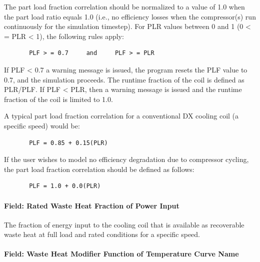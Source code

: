 The part load fraction correlation should be normalized to a value of 1.0 when the part load ratio equals 1.0 (i.e., no efficiency losses when the compressor(s) run continuously for the simulation timestep). For PLR values between 0 and 1 (0 \textless{} = PLR \textless{} 1), the following rules apply:

\begin{lstlisting}
       PLF > = 0.7     and     PLF > = PLR
\end{lstlisting}

If PLF \textless{} 0.7 a warning message is issued, the program resets the PLF value to 0.7, and the simulation proceeds. The runtime fraction of the coil is defined as PLR/PLF. If PLF \textless{} PLR, then a warning message is issued and the runtime fraction of the coil is limited to 1.0.

A typical part load fraction correlation for a conventional DX cooling coil (a specific speed) would be:

\begin{lstlisting}
       PLF = 0.85 + 0.15(PLR)
\end{lstlisting}

If the user wishes to model no efficiency degradation due to compressor cycling, the part load fraction correlation should be defined as follows:

\begin{lstlisting}
       PLF = 1.0 + 0.0(PLR)
\end{lstlisting}

\paragraph{Field: Rated Waste Heat Fraction of Power Input}\label{field-rated-waste-heat-fraction-of-power-input}

The fraction of energy input to the cooling coil that is available as recoverable waste heat at full load and rated conditions for a specific speed.

\paragraph{Field: Waste Heat Modifier Function of Temperature Curve Name}\label{field-waste-heat-function-of-temperature-curve-name}

